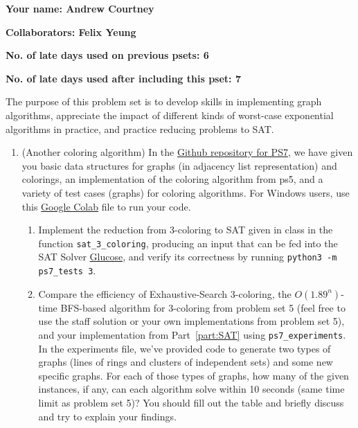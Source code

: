 \documentclass[11pt]{article}
\begin{document}

\textbf{Your name: Andrew Courtney}

\textbf{Collaborators: Felix Yeung}

\textbf{No. of late days used on previous psets: 6}

\textbf{No. of late days used after including this pset: 7}


The purpose of this problem set is to develop skills in implementing graph algorithms, appreciate the impact of different kinds of worst-case exponential algorithms in practice, and practice reducing problems to SAT.
\begin{enumerate}

    \item (Another coloring algorithm) 
  In the \href{https://github.com/Harvard-CS-120/cs120/tree/main/fall2022/psets/ps7}{Github repository for PS7}, we have given you basic data structures for graphs (in adjacency list representation) and colorings, an implementation of the coloring algorithm from ps5, and a variety of test cases (graphs) for coloring algorithms. For Windows users, use this \href{https://colab.research.google.com/drive/13nMhNMaDstVaEkxye61m8AV7nk9ks9uS#scrollTo=AbIalcylVVuu}{Google Colab} file to run your code.
  
  \begin{enumerate}      
      \item Implement the reduction from 3-coloring to SAT given in class in the function \texttt{sat\_3\_coloring}, producing an input that can be fed into the SAT Solver \href{https://pysathq.github.io/usage/}{Glucose}, and verify its correctness by running \texttt{python3 -m ps7\_tests 3}. \label{part:SAT}
      \item Compare the efficiency of Exhaustive-Search 3-coloring, the $O(1.89^n)$-time BFS-based algorithm for 3-coloring from problem set 5 (feel free to use the staff solution or your own implementations from problem set 5), and your implementation from Part~\ref{part:SAT} using \texttt{ps7\_experiments}. In the experiments file, we've provided code to generate two types of graphs (lines of rings and clusters of independent sets) and some new specific graphs. For each of those types of graphs, how many of the given instances, if any, can each algorithm solve within 10 seconds (same time limit as problem set 5)? You should fill out the table and briefly discuss and try to explain your findings.


\end{enumerate}
\end{enumerate}
\end{document}
